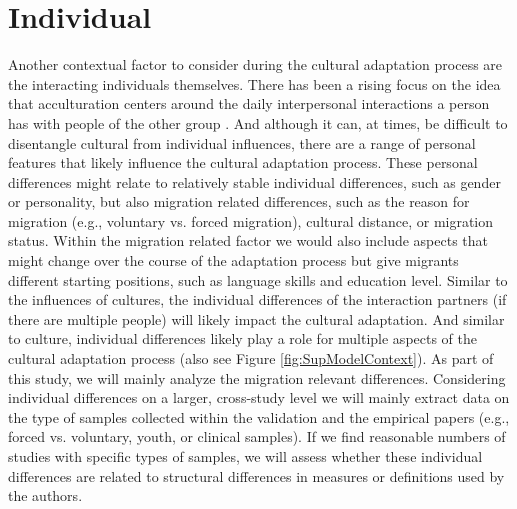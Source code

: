 \documentclass[man, 12pt, a4paper]{apa7}
\begin{document}
\section{Individual} 
Another contextual factor to consider during the cultural adaptation process are the interacting individuals themselves. There has been a rising focus on the idea that acculturation centers around the daily interpersonal interactions a person has with people of the other group \citep{Maxwell2017, Sam2010}. And although it can, at times, be difficult to disentangle cultural from individual influences, there are a range of personal features that likely influence the cultural adaptation process. These personal differences might relate to relatively stable individual differences, such as gender or personality, but also migration related differences, such as the reason for migration (e.g., voluntary vs. forced migration), cultural distance, or migration status. Within the migration related factor we would also include aspects that might change over the course of the adaptation process but give migrants different starting positions, such as language skills and education level.
Similar to the influences of cultures, the individual differences of the interaction partners (if there are multiple people) will likely impact the cultural adaptation. And similar to culture, individual differences likely play a role for multiple aspects of the cultural adaptation process (also see Figure \ref{fig:SupModelContext}). As part of this study, we will mainly analyze the migration relevant differences. Considering individual differences on a larger, cross-study level we will mainly extract data on the type of samples collected within the validation and the empirical papers (e.g., forced vs. voluntary, youth, or clinical samples). If we find reasonable numbers of studies with specific types of samples, we will assess whether these individual differences are related to structural differences in measures or definitions used by the authors.
\end{document}
